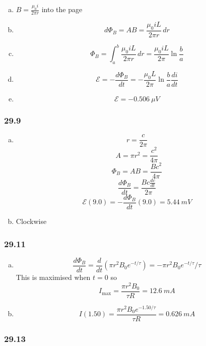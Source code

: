 \documentclass{article}
\begin{document}
\begin{enumerate}[(a)]
  \item $B = \frac{\mu_0 i}{2 \pi r}$ into the page

  \item \[d \Phi_B = A B = \frac{\mu_0 i L}{2 \pi r} \,dr\]

  \item \[\Phi_B = \int_a^b \frac{\mu_0 i L}{2 \pi r} \,dr = \frac{\mu_0 i L}{2 \pi} \ln \frac{b}{a}\]

  \item \[\mathcal{E} = -\frac{d \Phi_B}{dt} = -\frac{\mu_0 L}{2 \pi} \ln \frac{b}{a} \frac{di}{dt}\]

  \item \[\mathcal{E} = \qty{-0.506}{\mu V}\]
\end{enumerate}

\subsubsection{29.9}

\begin{enumerate}[(a)]
  \item \[r = \frac{c}{2 \pi}\] \[A = \pi r^2 = \frac{c^2}{4 \pi}\] \[\Phi_B = A B = \frac{B c^2}{4 \pi}\] \[\frac{d \Phi_B}{dt} = \frac{B c \frac{dc}{dt}}{2 \pi}\] \[\mathcal{E}(9.0) = -\frac{d \Phi_B}{dt}(9.0) = \qty{5.44}{mV}\]

  \item Clockwise
\end{enumerate}

\subsubsection{29.11}

\begin{enumerate}[(a)]
  \item \[\frac{d \Phi_B}{dt} = \frac{d}{dt} (\pi r^2 B_0 e^{-t / \tau}) = -\pi r^2 B_0 e^{-t / \tau} / \tau\] This is maximised when $t = 0$ so \[I_\text{max} = \frac{\pi r^2 B_0}{\tau R} = \qty{12.6}{mA}\]

  \item \[I(1.50) = \frac{\pi r^2 B_0 e^{-1.50 / \tau}}{\tau R} = \qty{0.626}{mA}\]
\end{enumerate}

\subsubsection{29.13}
\end{document}
